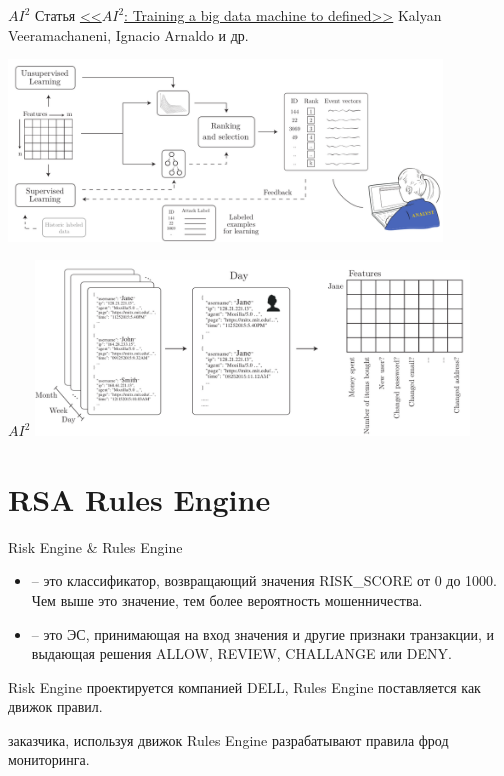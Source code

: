 \begin{frame}{$AI^2$}
	Статья \textcolor{blue}{\href{https://yadi.sk/i/dJ-SrV4y3JFSPV}{<<$AI^2$: Training a big data machine to defined>>}} Kalyan Veeramachaneni, Ignacio Arnaldo и др.
	
		\includegraphics[width=11.5cm]{../pic/ai2_first.png}	
\end{frame}


\begin{frame}{$AI^2$}
	\includegraphics[width=11.5cm]{../pic/ai2_second.png}
\end{frame}

\section{RSA Rules Engine}\label{section:rules_engine}

\begin{frame}{Risk Engine \& Rules Engine}
	\begin{itemize}
		\item {} -- это классификатор, 
		возвращающий значения RISK\_SCORE от 0 до 1000. 
		Чем выше это значение, тем более вероятность мошенничества.
		\item {} -- это ЭС,
		принимающая на вход значения 
		и другие признаки транзакции, и выдающая решения
		ALLOW, REVIEW, CHALLANGE или DENY.
	\end{itemize}
	
	Risk Engine проектируется компанией DELL, 
	Rules Engine поставляется как движок правил. 
	
	 заказчика, используя движок Rules Engine разрабатывают 
	правила фрод мониторинга.
\end{frame}

